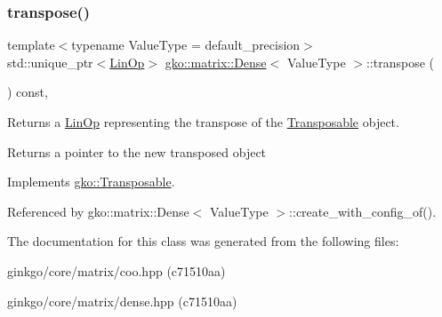 \subsubsection{\texorpdfstring{transpose()}{transpose()}}
{\footnotesize\ttfamily template$<$typename Value\+Type = default\+\_\+precision$>$ \\
std\+::unique\+\_\+ptr$<$\hyperlink{classgko_1_1LinOp}{Lin\+Op}$>$ \hyperlink{classgko_1_1matrix_1_1Dense}{gko\+::matrix\+::\+Dense}$<$ Value\+Type $>$\+::transpose (\begin{DoxyParamCaption}{ }\end{DoxyParamCaption}) const\hspace{0.3cm}{\ttfamily [override]}, {\ttfamily [virtual]}}



Returns a \hyperlink{classgko_1_1LinOp}{Lin\+Op} representing the transpose of the \hyperlink{classgko_1_1Transposable}{Transposable} object. 

\begin{DoxyReturn}{Returns}
a pointer to the new transposed object 
\end{DoxyReturn}


Implements \hyperlink{classgko_1_1Transposable_a5c6b778b71b47d53e0bda6ccf894d318}{gko\+::\+Transposable}.



Referenced by gko\+::matrix\+::\+Dense$<$ Value\+Type $>$\+::create\+\_\+with\+\_\+config\+\_\+of().



The documentation for this class was generated from the following files\+:\begin{DoxyCompactItemize}
\item 
ginkgo/core/matrix/coo.\+hpp (c71510aa)\item 
ginkgo/core/matrix/dense.\+hpp (c71510aa)\end{DoxyCompactItemize}
